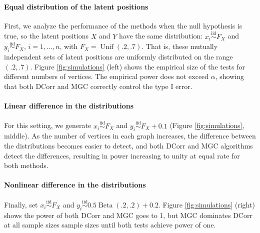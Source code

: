 \paragraph{Equal distribution of the latent positions}
First, we analyze the performance of the methods when the null hypothesis is true, so the latent positions $X$ and $Y$ have the same distribution: $x_i \overset{\text{iid}}{\sim} F_X$ and $y_i \overset{\text{iid}}{\sim} F_X$, $i=1,\ldots,n$,
with
$F_X = \operatorname{Unif}(.2,.7)$.
That is, these mutually independent sets of latent positions are uniformly distributed on the range $(.2, .7)$.
Figure \ref{fig:simulations} (left) shows the empirical size of the tests for different numbers of vertices. The empirical power does not exceed $\alpha$, showing that both DCorr and MGC correctly control the type I error.
 
\paragraph{Linear difference in the distributions}
For this setting, we generate $x_i \overset{\text{iid}}{\sim} F_X$ and $y_i \overset{\text{iid}}{\sim} F_X + 0.1$ (Figure \ref{fig:simulations}, middle).
As the number of vertices in each graph increases, the difference between the distributions becomes easier to detect, and both DCorr and MGC algorithms detect the differences, resulting in power increasing to unity at equal rate for both methods.

\paragraph{Nonlinear difference in the distributions}
Finally, set $x_i \overset{\text{iid}}{\sim} F_X$ and $y_i \overset{\text{iid}}{\sim} 0.5\operatorname{Beta}(.2, .2)+0.2$. Figure \ref{fig:simulations} (right) shows  the power of both DCorr and MGC goes to 1, but MGC dominates DCorr at  all sample sizes sample sizes until both tests achieve power of one.

